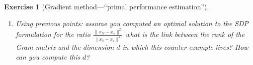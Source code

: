 \documentclass[11pt,a4paper]{article}
\newcommand{\correction}[1]{{{\color{blue}\underline{Correction:} #1}}}
\newcommand{\correction}[1]{}
\newtheorem{exercise}{Exercise}
\begin{document}
\begin{exercise}[Gradient method---``primal performance estimation'']
\begin{enumerate}
	\correction{ Following the same steps, we arrive to \begin{equation*}
		\begin{aligned}
		\sup_{\substack{d\\x_0,x_1,\ldots,x_{N},x_\star\\g_0,g_{1},\ldots,g_{N-1},g_\star\\f_k,f_{k+1},f_\star}} \quad & \|x_N-x_\star\|^2\\
		\text{s.t. } & \exists f\in\mathcal{F}_{\mu,L} \text{ such that }\left\{\begin{array}{ll}
			f_i=f(x_i)\quad & i=0,1,\ldots,N-1,\star\\
			g_i=\nabla f(x_i)\quad & i=0,1,\ldots,N-1,\star
			\end{array}\right.\\
		& x_{i+1}=x_i-\gamma_i  g_i \quad i=0,1,\ldots,N-1\\
		& \|x_0-x_\star\|^2= 1\\
		& g_\star=0.\\
		\end{aligned}
		\end{equation*}
	This formulation naturally translates to a $(N+1)\times (N+1)$ SDP with
			\begin{align*}
			P = [x_0-x_\star,\, g_0,\, g_1,\,\ldots,\,g_{N-1}]\\
			G \triangleq P^{\top\!}P\succcurlyeq0,\quad 	F \triangleq 			[f_0-f_\star,\, f_{1}-f_\star,\, f_{N-1}-f_\star].
			\end{align*}
	along with $N(N+1)$ interpolation inequalities (two inequalities per pair of points in the discrete representation).}
	
	\item Using previous points: assume you computed an optimal solution to the SDP formulation for the ratio $\frac{\|x_{N}-x_\star\|^2}{\|x_0-x_\star\|^2}$ what is the link between the rank of the Gram matrix and the dimension $d$ in which this counter-example lives? How can you compute this $d$?
	

\end{enumerate}
\end{exercise}
\end{document}
